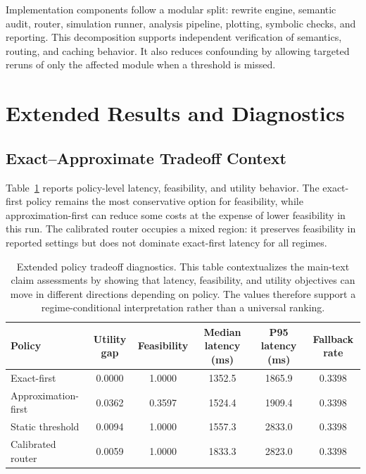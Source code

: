 \documentclass{article} %
\begin{document}
Implementation components follow a modular split: rewrite engine, semantic audit, router, simulation runner, analysis pipeline, plotting, symbolic checks, and reporting. This decomposition supports independent verification of semantics, routing, and caching behavior. It also reduces confounding by allowing targeted reruns of only the affected module when a threshold is missed.

\section{Extended Results and Diagnostics}
\label{sec:app_results}
\subsection{Exact--Approximate Tradeoff Context}
Table~\ref{tab:tradeoff_ext} reports policy-level latency, feasibility, and utility behavior. The exact-first policy remains the most conservative option for feasibility, while approximation-first can reduce some costs at the expense of lower feasibility in this run. The calibrated router occupies a mixed region: it preserves feasibility in reported settings but does not dominate exact-first latency for all regimes.

\begin{table}[h]
\caption{Extended policy tradeoff diagnostics. This table contextualizes the main-text claim assessments by showing that latency, feasibility, and utility objectives can move in different directions depending on policy. The values therefore support a regime-conditional interpretation rather than a universal ranking.}
\label{tab:tradeoff_ext}
\begin{center}
\footnotesize
\renewcommand{\arraystretch}{1.1}
\setlength{\tabcolsep}{4pt}
\begin{tabular}{lccccc}
\hline
Policy & Utility gap & Feasibility & Median latency (ms) & P95 latency (ms) & Fallback rate \\
\hline
Exact-first & 0.0000 & 1.0000 & 1352.5 & 1865.9 & 0.3398 \\
Approximation-first & 0.0362 & 0.3597 & 1524.4 & 1909.4 & 0.3398 \\
Static threshold & 0.0094 & 1.0000 & 1557.3 & 2833.0 & 0.3398 \\
Calibrated router & 0.0059 & 1.0000 & 1833.3 & 2823.0 & 0.3398 \\
\hline
\end{tabular}
\end{center}
\end{table}
\end{document}
